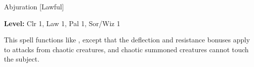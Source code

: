 
Abjuration [Lawful]

\textbf{Level:} Clr 1, Law 1, Pal 1, Sor/Wiz 1

This spell functions like , except that the deflection 
and resistance bonuses apply to attacks from chaotic creatures, and chaotic summoned 
creatures cannot touch the subject.


